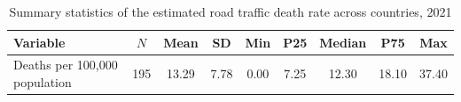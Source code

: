 \begin{table}[t]
\centering
\begin{threeparttable}
\caption{Summary statistics of the estimated road traffic death rate across countries, 2021}
\label{tab:summary}
\begin{tabular}{lcccccccc}
\toprule
Variable & $N$ & Mean & SD & Min & P25 & Median & P75 & Max \\
\midrule
Deaths per 100,000 population & 195 & 13.29 & 7.78 & 0.00 & 7.25 & 12.30 & 18.10 & 37.40 \\
\bottomrule
\end{tabular}
\end{threeparttable}
\end{table}
